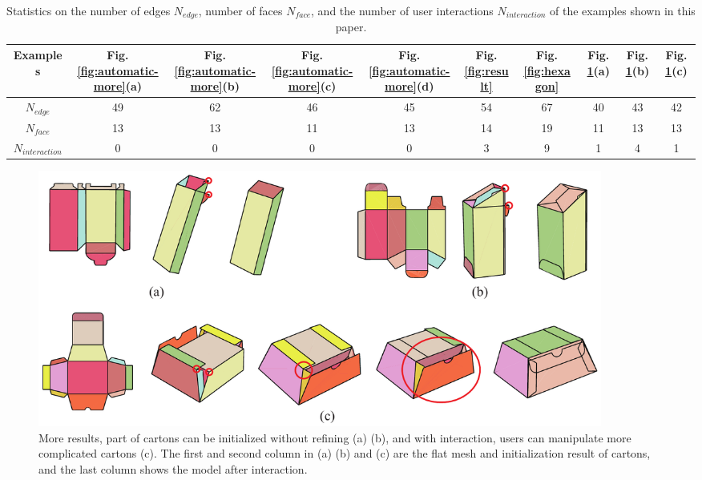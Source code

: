 \begin{table}
	\centering
	\caption{Statistics on the number of edges $N_{edge}$, number of faces $N_{face}$, and the number of user interactions $N_{interaction}$ of the examples shown in this paper.}
	\begin{tabular}{c|ccccccccc}
		\hline
		Examples & Fig.\ref{fig:automatic-more}(a) & Fig.\ref{fig:automatic-more}(b) &  Fig.\ref{fig:automatic-more}(c) & Fig.\ref{fig:automatic-more}(d) & Fig.\ref{fig:result} & Fig.\ref{fig:hexagon} & Fig.\ref{fig:result-more}(a) & Fig.\ref{fig:result-more}(b)& Fig.\ref{fig:result-more}(c)\\
		\hline
		$N_{edge}$ & 49 & 62 & 46 & 45 & 54 & 67 & 40 & 43 & 42 \\
		$N_{face}$  & 13 & 13 & 11 & 13 & 14 & 19 & 11 & 13 & 13 \\
		$N_{interaction}$  & 0 & 0 & 0 & 0 & 3 & 9 & 1 & 4 & 1\\ 
		\hline
		\end{tabular}
		\label{table:statistics}
\end{table}



\begin{figure}
	\centering
	\includegraphics[width=0.9\textwidth]{images/interactiveresults-more}
	\caption{More results, part of cartons can be initialized without refining (a) (b), and with interaction, users can manipulate more complicated cartons (c). The first and second column in (a) (b) and (c) are the flat mesh and initialization result of cartons, and the last column shows the model after interaction.}
	\label{fig:result-more}
\end{figure}